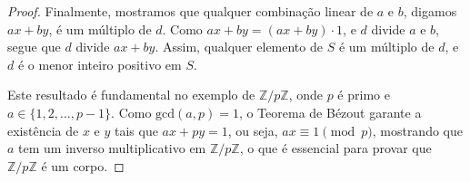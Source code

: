 \begin{proof}
  Finalmente, mostramos que qualquer combinação linear de $a$ e $b$, digamos
  $ax + by$, é um múltiplo de $d$. Como $ax + by = (ax + by) \cdot 1$, e $d$
  divide $a$ e $b$, segue que $d$ divide $ax + by$. Assim, qualquer elemento de
  $S$ é um múltiplo de $d$, e $d$ é o menor inteiro positivo em $S$.

  Este resultado é fundamental no exemplo de $\mathbb{Z}/p\mathbb{Z}$, onde $p$
  é primo e $a \in \{1, 2, \ldots, p-1\}$. Como $\text{gcd}(a, p) = 1$, o
  Teorema de Bézout garante a existência de $x$ e $y$ tais que $ax + py = 1$,
  ou seja, $ax \equiv 1 \pmod{p}$, mostrando que $a$ tem um inverso
  multiplicativo em $\mathbb{Z}/p\mathbb{Z}$, o que é essencial para provar que
  $\mathbb{Z}/p\mathbb{Z}$ é um corpo.
\end{proof}



